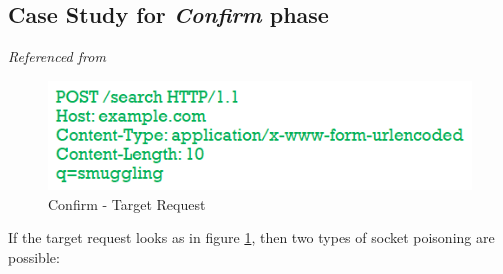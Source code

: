 \subsection{Case Study for \textit{Confirm} phase}
\textit{Referenced from \cite{b6}}\\
\begin{figure}
	\includegraphics{images/Confirm_Request}
	\caption{Confirm - Target Request}
	\label{fig:Confirm_Request}
\end{figure}
If the target request looks as in figure \ref{fig:Confirm_Request}, then two types of socket poisoning are possible:
